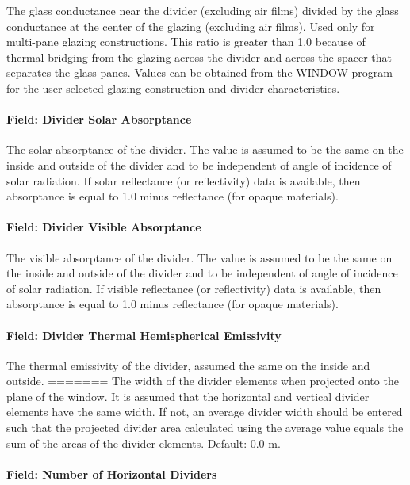 The glass conductance near the divider (excluding air films) divided by the glass conductance at the center of the glazing (excluding air films). Used only for multi-pane glazing constructions. This ratio is greater than 1.0 because of thermal bridging from the glazing across the divider and across the spacer that separates the glass panes. Values can be obtained from the WINDOW program for the user-selected glazing construction and divider characteristics.

\paragraph{Field: Divider Solar Absorptance}\label{field-divider-solar-absorptance}

The solar absorptance of the divider. The value is assumed to be the same on the inside and outside of the divider and to be independent of angle of incidence of solar radiation. If solar reflectance (or reflectivity) data is available, then absorptance is equal to 1.0 minus reflectance (for opaque materials).

\paragraph{Field: Divider Visible Absorptance}\label{field-divider-visible-absorptance}

The visible absorptance of the divider. The value is assumed to be the same on the inside and outside of the divider and to be independent of angle of incidence of solar radiation. If visible reflectance (or reflectivity) data is available, then absorptance is equal to 1.0 minus reflectance (for opaque materials).

\paragraph{Field: Divider Thermal Hemispherical Emissivity}\label{field-divider-thermal-hemispherical-emissivity}

The thermal emissivity of the divider, assumed the same on the inside and outside.
=======
The width of the divider elements when projected onto the plane of the window. It is assumed that the horizontal and vertical divider elements have the same width. If not, an average divider width should be entered such that the projected divider area calculated using the average value equals the sum of the areas of the divider elements. Default: 0.0 m.

\paragraph{Field: Number of Horizontal Dividers}\label{field-number-of-horizontal-dividers}

